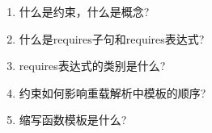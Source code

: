 \begin{enumerate}
\item
什么是约束，什么是概念?

\item
什么是requires子句和requires表达式?

\item
requires表达式的类别是什么?

\item
约束如何影响重载解析中模板的顺序?

\item
缩写函数模板是什么?
\end{enumerate}